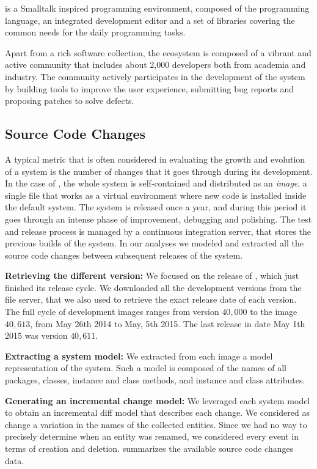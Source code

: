 \pha is a Smalltalk inspired programming environment, composed of the \pha programming language, an integrated development editor and a set of libraries covering the common needs for the daily programming tasks. 

Apart from a rich software collection, the \pha ecosystem is composed of a vibrant and active community that includes about 2,000 developers both from academia and industry. The community actively participates in the development of the system by building tools to improve the user experience, submitting bug reports and proposing patches to solve defects.



\subsection{Source Code Changes}\label{sub:changes}

A typical metric that is often considered in evaluating the growth and evolution of a system is the number of changes that it goes through during its development. In the case of \pha, the whole system is self-contained and distributed as an \emph{image}, a single file that works as a virtual environment where new code is installed inside the default system. The \pha system is released once a year, and during this period it goes through an intense phase of improvement, debugging and polishing. The test and release process is managed by a continuous integration server, that stores the previous builds of the system. In our analyses we modeled and extracted all the source code changes between subsequent releases of the \pha system.

{\bfseries Retrieving the different version:} We focused on the release of , which just finished its release cycle. We downloaded all the development versions from the file server, that we also used to retrieve the exact release date of each version. The full cycle of development images ranges from version $40,000$ to the image $40,613$, from May 26th 2014 to May, 5th 2015. The last release in date May 1th 2015 was version $40,611$.
 
{\bfseries Extracting a system model:} We extracted from each image a model representation of the system. Such a model is composed of the names of all packages, classes, instance and class methods, and instance and class attributes.

{\bfseries Generating an incremental change model:} We leveraged each system model to obtain an incremental diff model that describes each change. We considered as change a variation in the names of the collected entities. Since we had no way to precisely determine when an entity was renamed, we considered every event in terms of creation and deletion.  summarizes the available source code changes data.

